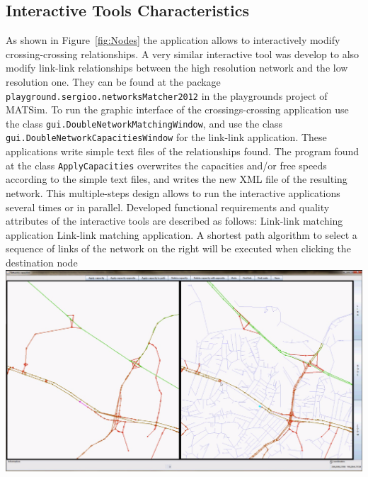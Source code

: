 \subsection{Interactive Tools Characteristics}
As shown in Figure~\ref{fig:Nodes} the application allows to interactively modify crossing-crossing relationships. A very similar interactive tool was develop to also modify link-link relationships between the high resolution network and the low resolution one. They can be found at the package \lstinline|playground.sergioo.networksMatcher2012| in the playgrounds project of MATSim. To run the graphic interface of the crossings-crossing application use the class \lstinline|gui.DoubleNetworkMatchingWindow|, and use the class \lstinline|gui.DoubleNetworkCapacitiesWindow| for the link-link application. These applications write simple text files of the relationships found. The program found at the class \lstinline|ApplyCapacities| overwrites the capacities and/or free speeds according to the simple text files, and writes the new XML file of the resulting network. This multiple-steps design allows to run the interactive applications several times or in parallel. Developed functional requirements and quality attributes of the interactive tools are described as follows:
%
\createfigure
{Link-link matching application}
{Link-link matching application. A shortest path algorithm to select a sequence of links of the network on the right will be executed when clicking the destination node}
{\label{fig:Links}}
{\includegraphics[width=1.0\textwidth]{extending/figures/netEdSing/Links.png}}
{}


